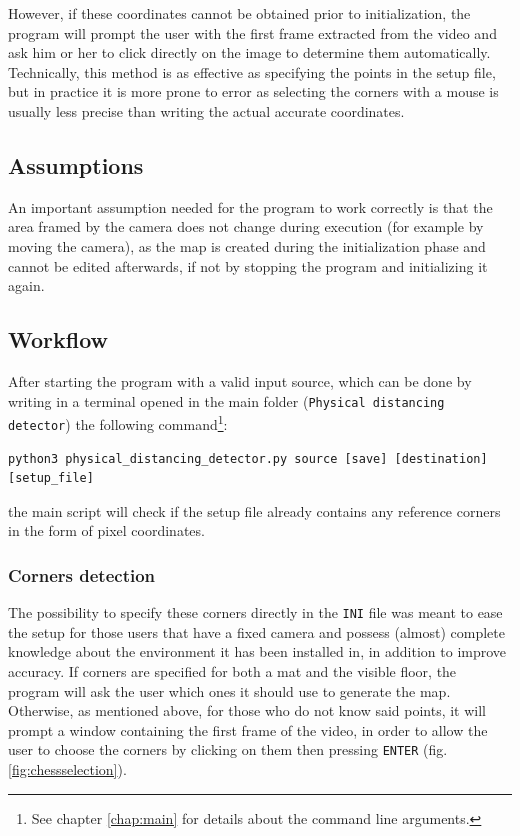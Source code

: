 \documentclass[12pt]{article}
\begin{document}
However, if these coordinates cannot be obtained prior to initialization, the program will prompt the user with the first frame extracted from the video and ask him or her to click directly on the image to determine them automatically. Technically, this method is as effective as specifying the points in the setup file, but in practice it is more prone to error as selecting the corners with a mouse is usually less precise than writing the actual accurate coordinates.

\subsection{Assumptions}
\label{chap:assumptions}
An important assumption needed for the program to work correctly is that the area framed by the camera does not change during execution (for example by moving the camera), as the map is created during the initialization phase and cannot be edited afterwards, if not by stopping the program and initializing it again.

\subsection{Workflow}
\label{chap:workflow}
After starting the program with a valid input source, which can be done by writing in a terminal opened in the main folder (\lstinline{Physical distancing detector}) the following command\footnote{See chapter \ref{chap:main} for details about the command line arguments.}:
\begin{lstlisting}[style=bash]
python3 physical_distancing_detector.py source [save] [destination] [setup_file]
\end{lstlisting}
the main script will check if the setup file already contains any reference corners in the form of pixel coordinates.

\subsubsection{Corners detection}
\label{chap:corners}
The possibility to specify these corners directly in the \lstinline{INI} file was meant to ease the setup for those users that have a fixed camera and possess (almost) complete knowledge about the environment it has been installed in, in addition to improve accuracy. If corners are specified for both a mat and the visible floor, the program will ask the user which ones it should use to generate the map. Otherwise, as mentioned above, for those who do not know said points, it will prompt a window containing the first frame of the video, in order to allow the user to choose the corners by clicking on them then pressing \lstinline{ENTER} (fig. \ref{fig:chessselection}).
\end{document}
